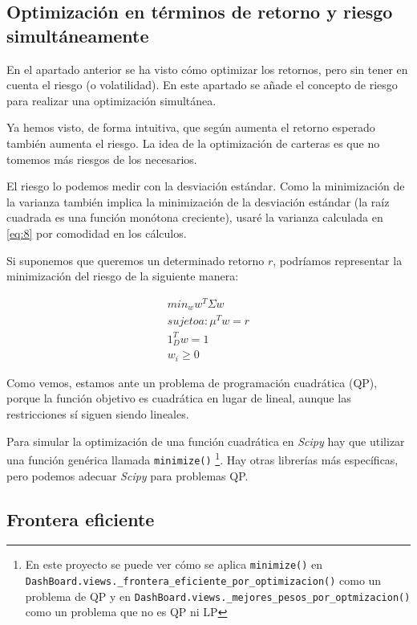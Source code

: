 \subsection{Optimización en términos de retorno y riesgo simultáneamente}

En el apartado anterior se ha visto cómo optimizar los retornos, pero sin tener en cuenta el riesgo (o volatilidad). En este apartado se añade el concepto de riesgo para realizar una optimización simultánea. 

Ya hemos visto, de forma intuitiva, que según aumenta el retorno esperado también aumenta el riesgo. La idea de la optimización de carteras es que no tomemos más riesgos de los necesarios. 

El riesgo lo podemos medir con la desviación estándar. Como la minimización de la varianza también implica la minimización de la desviación estándar (la raíz cuadrada es una función monótona creciente), usaré la varianza calculada en \ref{eq:8} por comodidad en los cálculos.

Si suponemos que queremos un determinado retorno $r$, podríamos representar la minimización del riesgo de la siguiente manera:

\begin{equation} \label{eq:9}
\begin{aligned}
	min_{w} w^{T}\Sigma w \\
	sujeto a: \mu^{T}w = r \\
	1_{D}^{T}w = 1 \\
	w_{i} \geq 0
\end{aligned}
\end{equation}

Como vemos, estamos ante un problema de programación cuadrática (QP), porque la función objetivo es cuadrática en lugar de lineal, aunque las restricciones sí siguen siendo lineales. 

Para simular la optimización de una función cuadrática en \emph{Scipy} hay que utilizar una función genérica llamada \texttt{minimize()} \footnote{En este proyecto se puede ver cómo se aplica \texttt{minimize()} en \texttt{DashBoard.views.\_frontera\_eficiente\_por\_optimizacion()} como un problema de QP y en \texttt{DashBoard.views.\_mejores\_pesos\_por\_optmizacion()} como un problema que no es QP ni LP}. Hay otras librerías más específicas, pero podemos adecuar \emph{Scipy} para problemas QP.


\subsection{Frontera eficiente}

